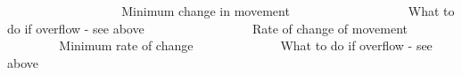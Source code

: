 ~\newline
~\newline
~\newline
~\newline
~\newline
~\newline
~\newline
~\newline
~\newline
~\newline
~\newline
 Minimum change in movement ~\newline
~\newline
~\newline
~\newline
~\newline
~\newline
~\newline
~\newline
~\newline
~\newline
~\newline
 What to do if overflow -\/ see above ~\newline
~\newline
~\newline
~\newline
~\newline
~\newline
~\newline
~\newline
~\newline
~\newline
 Rate of change of movement ~\newline
~\newline
~\newline
~\newline
~\newline
~\newline
~\newline
~\newline
~\newline
 Minimum rate of change ~\newline
~\newline
~\newline
~\newline
~\newline
~\newline
~\newline
~\newline
 What to do if overflow -\/ see above ~\newline
